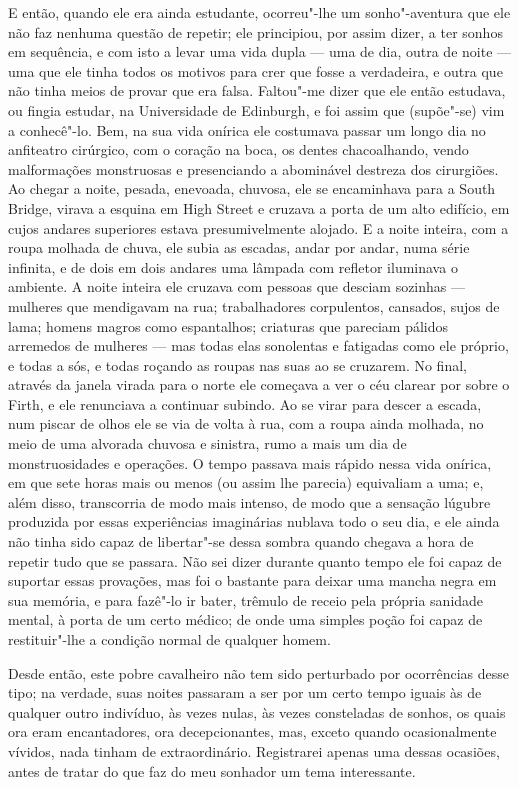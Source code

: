E então, quando ele era ainda estudante, ocorreu"-lhe um sonho"-aventura
que ele não faz nenhuma questão de repetir; ele principiou, por assim
dizer, a ter sonhos em sequência, e com isto a levar uma vida dupla ---
uma de dia, outra de noite --- uma que ele tinha todos os motivos para
crer que fosse a verdadeira, e outra que não tinha meios de provar que
era falsa.  Faltou"-me dizer que ele então estudava, ou fingia estudar,
na Universidade de Edinburgh, e foi assim que (supõe"-se) vim a
conhecê"-lo.  Bem, na sua vida onírica ele costumava passar um longo dia
no anfiteatro cirúrgico, com o coração na boca, os dentes chacoalhando,
vendo malformações monstruosas e presenciando a abominável destreza dos
cirurgiões.  Ao chegar a noite, pesada, enevoada, chuvosa, ele se
encaminhava para a South Bridge, virava a esquina em High Street e
cruzava a porta de um alto edifício, em cujos andares superiores estava
presumivelmente alojado.  E a noite inteira, com a roupa molhada de
chuva, ele subia as escadas, andar por andar, numa série infinita, e de
dois em dois andares uma lâmpada com refletor iluminava o ambiente.  A
noite inteira ele cruzava com pessoas que desciam sozinhas --- mulheres
que mendigavam na rua; trabalhadores corpulentos, cansados, sujos de
lama; homens magros como espantalhos; criaturas que pareciam pálidos
arremedos de mulheres --- mas todas elas sonolentas e fatigadas como ele
próprio, e todas a sós, e todas roçando as roupas nas suas ao se
cruzarem.  No final, através da janela virada para o norte ele começava
a ver o céu clarear por sobre o Firth, e ele renunciava a continuar		
subindo.  Ao se virar para descer a escada, num piscar de olhos ele se
via de volta à rua, com a roupa ainda molhada, no meio de uma alvorada
chuvosa e sinistra, rumo a mais um dia de monstruosidades e operações. 
O tempo passava mais rápido nessa vida onírica, em que sete horas mais
ou menos (ou assim lhe parecia) equivaliam a uma; e, além disso,
transcorria de modo mais intenso, de modo que a sensação lúgubre
produzida por essas experiências imaginárias nublava todo o seu dia, e
ele ainda não tinha sido capaz de libertar"-se dessa sombra quando
chegava a hora de repetir tudo que se passara.  Não sei dizer durante
quanto tempo ele foi capaz de suportar essas provações, mas foi o
bastante para deixar uma mancha negra em sua memória, e para fazê"-lo ir
bater, trêmulo de receio pela própria sanidade mental, à porta de um
certo médico; de onde uma simples poção foi capaz de restituir"-lhe a
condição normal de qualquer homem.

Desde então, este pobre cavalheiro não tem sido perturbado por
ocorrências desse tipo; na verdade, suas noites passaram a ser por um
certo tempo iguais às de qualquer outro indivíduo, às vezes nulas, às
vezes consteladas de sonhos, os quais ora eram encantadores, ora
decepcionantes, mas, exceto quando ocasionalmente vívidos, nada tinham
de extraordinário.  Registrarei apenas uma dessas ocasiões, antes de
tratar do que faz do meu sonhador um tema interessante.

